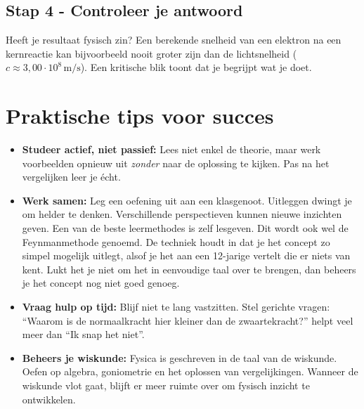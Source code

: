 \documentclass{ximera}
\begin{document}
\subsection*{Stap 4 - Controleer je antwoord}

  Heeft je resultaat fysisch zin? Een berekende snelheid van een elektron na een kernreactie kan bijvoorbeeld nooit groter zijn dan de lichtsnelheid ($c \approx 3,00 \cdot 10^8 \mathrm{\, m/s}$). Een kritische blik toont dat je begrijpt wat je doet.

\section*{Praktische tips voor succes}

\begin{itemize}
  \item \textbf{Studeer actief, niet passief:}  
  Lees niet enkel de theorie, maar werk voorbeelden opnieuw uit \textit{zonder} naar de oplossing te kijken.  
  Pas na het vergelijken leer je écht.

  \item \textbf{Werk samen:}  
  Leg een oefening uit aan een klasgenoot. Uitleggen dwingt je om helder te denken.  
  Verschillende perspectieven kunnen nieuwe inzichten geven. Een van de beste leermethodes is zelf lesgeven. Dit wordt ook wel de Feynmanmethode genoemd. De techniek houdt in dat je het concept zo simpel mogelijk uitlegt, alsof je het aan een 12-jarige vertelt die er niets van kent. Lukt het je niet om het in eenvoudige taal over te brengen, dan beheers je het concept nog niet goed genoeg.
 
  \item \textbf{Vraag hulp op tijd:}  
  Blijf niet te lang vastzitten. Stel gerichte vragen:  
  “Waarom is de normaalkracht hier kleiner dan de zwaartekracht?” helpt veel meer dan “Ik snap het niet”.

  \item \textbf{Beheers je wiskunde:}  
  Fysica is geschreven in de taal van de wiskunde.
  Oefen op algebra, goniometrie en het oplossen van vergelijkingen.
  Wanneer de wiskunde vlot gaat, blijft er meer ruimte over om fysisch inzicht te ontwikkelen.


\end{itemize}
\end{document}
